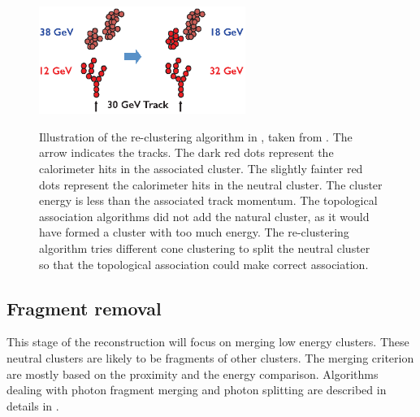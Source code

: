 \begin{figure}[tbph]
\centering
{\includegraphics[width=0.6\textwidth]{pandora/recluster}}%
\caption[Illustration of the re-clustering algorithm in \pandora]
{Illustration of the re-clustering algorithm in \pandora, taken from \cite{Marshall:pandoraLC}. The arrow indicates the tracks. The dark red dots represent the calorimeter hits in the associated cluster. The  slightly fainter red  dots represent the calorimeter hits in the neutral cluster. The cluster energy is less than the associated track momentum. The topological association algorithms did not add the natural cluster, as it would have formed a cluster with too much energy. The re-clustering algorithm tries different cone clustering to split the neutral cluster so that the topological association could make correct association.}
\label{fig:pandoraRecluster}
\end{figure}

\subsection{Fragment removal}
\label{sec:pandoraFragmentRemoval}

This stage of the reconstruction will focus on merging low energy clusters. These neutral clusters are likely to be fragments of other clusters. The merging criterion are mostly based on the proximity and the energy comparison. Algorithms dealing with photon fragment merging and photon splitting are described in details in .

